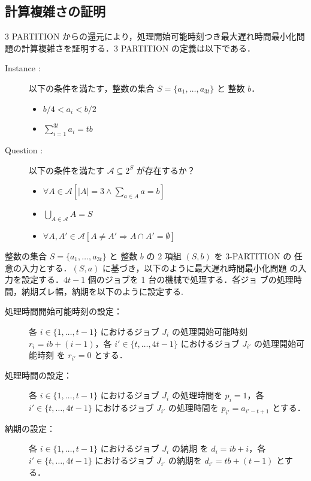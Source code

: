 \documentclass[12pt]{optlab-bachelor}
\begin{document}
\subsection{計算複雑さの証明}
3 PARTITION からの還元により，処理開始可能時刻つき最大遅れ時間最小化問題の計算複雑さを証明する．3 PARTITION の定義は以下である．
\begin{description}
  \item[Instance : ] 以下の条件を満たす，整数の集合 $S = \{a_1,\ldots,a_{3t}\}$ と 整数 $b$．
  \begin{itemize}
    \item $b/4 < a_i < b/2$
    \item $\displaystyle \sum_{i = 1}^{3t}a_i = tb$
  \end{itemize}
  \item[Question : ] 以下の条件を満たす $\mathcal{A} \subseteq 2^S$ が存在するか？
  \begin{itemize}
    \item $\forall A \in \mathcal{A}[|A| = 3 \land \sum_{a \in A} a = b]$
    \item $\bigcup_{A \in \mathcal{A}} A = S$
    \item $\forall A, A' \in \mathcal{A}[A \neq A' \Rightarrow A \cap A' = \emptyset]$
  \end{itemize}
\end{description}

整数の集合 $S = \{a_1,\ldots,a_{3t}\}$ と 整数 $b$ の 2 項組 $(S,b)$ を 3-PARTITION の
任意の入力とする．$(S,a)$ に基づき，以下のように最大遅れ時間最小化問題
の入力を設定する．$4t - 1$ 個のジョブを 1 台の機械で処理する．各゙ジョ
ブの処理時間，納期ズレ幅，納期を以下のように設定する.

\begin{description}
  \item[処理時間開始可能時刻の設定：] 各 $i \in \{1,\ldots,t - 1\}$ におけるジョブ $J_i$ の処理開始可能時刻
  $r_i = ib + (i - 1)$，各 $i' \in \{t,\ldots,4t - 1\}$ におけるジョブ $J_{i'}$ の処理開始可能時刻
  を $r_{i'} = 0$ とする．
  \item[処理時間の設定：] 各 $i \in \{1,\ldots,t - 1\}$ におけるジョブ $J_i$ の処理時間を $p_i = 1$，各 $i' \in \{t,\ldots,4t - 1\}$ におけるジョブ $J_{i'}$ の処理時間を $p_{i'} = a_{i' - t + 1}$ とする．
  \item[納期の設定：] 各 $i \in \{1,\ldots,t - 1\}$ におけるジョブ $J_i$ の納期
  を $d_i = ib + i$，各 $i' \in \{t,\ldots,4t - 1\}$ におけるジョブ $J_{i'}$ の納期を $d_{i'} = tb + (t - 1)$ とする．
\end{description}
\end{document}
